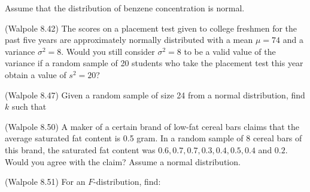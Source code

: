 \documentclass[14pt]{exam}
\begin{document}
\begin{questions}

		Assume that the distribution of benzene concentration is normal.
		
		\question
		(Walpole 8.42)
		The scores on a placement test given to college freshmen for the past five years are approximately normally distributed with a mean $\mu = 74$ and a variance $\sigma^2 = 8$. Would you still consider $\sigma^2 = 8$ to be a valid value of the variance if a random sample of 20 students who take the placement test this year obtain a value of $s^2 = 20$?
		
		\question
		(Walpole 8.47)
		 Given a random sample of size 24 from a normal
		distribution, find $k$ such that
		
		\question
		(Walpole 8.50)
		A maker of a certain brand of low-fat cereal bars claims that the average saturated fat content is 0.5 gram. In a random sample of 8 cereal bars of this brand, the saturated fat content was $0.6, 0.7, 0.7, 0.3, 0.4, 0.5, 0.4$ and $0.2$.  Would you agree with the claim? Assume a normal distribution.
		
		\question
		(Walpole 8.51)
		For an $F$-distribution, find:
\end{questions}
\end{document}
